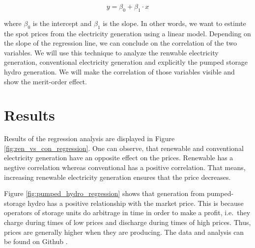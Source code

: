 \documentclass{article}
\begin{document}
\begin{equation}
    y = \beta_0 + \beta_1\cdot x
\end{equation}

where $\beta_0$ is the intercept and $\beta_1$ is the slope.
In other words, we want to estimte the spot prices from the electricity generation using a linear model.
Depending on the slope of the regression line, we can conclude on the correlation of the two variables. 
We will use this technique to analyze the renwable electricity generation, conventional electricity generation and explicitly the pumped storage hydro generation.
We will make the correlation of those variables visible and show the merit-order effect. 


\section{Results}

Results of the regression analysis are displayed in Figure \ref{fig:ren_vs_con_regression}. 
One can observe, that renewable and conventional electricity generation have an opposite effect on the prices. 
Renewable has a negtive correlation whereas conventional has a positive correlation. 
That means, increasing renewable electricity generation ensures that the price decreases.

Figure \ref{fig:pumped_hydro_regression} shows that generation from pumped-storage hydro has a positive relationship with the market price.
This is because operators of storage units do arbitrage in time in order to make a profit, i.e.\ they charge during times of low prices and discharge during times of high prices.
Thus, prices are generally higher when they are producing.
The data and analysis can be found on Github \citep{github_repo}.


\end{document}
